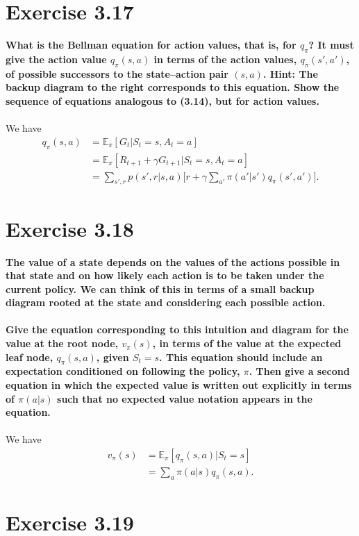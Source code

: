 \documentclass[a4paper,11pt]{article}
\numberwithin{equation}{section}
\theoremstyle{remark}
\newcommand{\E}{\mathbb E}
\begin{document}
\section{Exercise 3.17}

\textbf{What is the Bellman equation for action values, that is, for $q_\pi$? It must give the action value $q_\pi(s, a)$ in terms of the action values, $q_\pi(s', a')$, of possible successors to the state–action pair $(s, a)$. Hint: The backup diagram to the right corresponds to this equation. Show the sequence of equations analogous to (3.14), but for action values.}
\\ \\
We have
\begin{align*}
	q_\pi(s, a) & = \E_\pi[G_t | S_t=s, A_t=a] \\
				& = \E_\pi[R_{t+1} + \gamma G_{t+1} | S_t=s, A_t=a] \\
				& = \sum_{s', r} p(s', r | s, a) \Big[r + \gamma \sum_{a'} \pi(a' | s') q_\pi(s', a') \Big].
\end{align*}

\section{Exercise 3.18}

\textbf{The value of a state depends on the values of the actions possible in that state and on how likely each action is to be taken under the current policy. We can think of this in terms of a small backup diagram rooted at the state and considering each possible action.
\\ \\
Give the equation corresponding to this intuition and diagram for the value at the root node, $v_\pi(s)$, in terms of the value at the expected leaf node, $q_\pi(s, a)$, given $S_t = s$. This equation should include an expectation conditioned on following the policy, $\pi$. Then give a second equation in which the expected value is written out explicitly in terms of $\pi(a|s)$ such that no expected value notation appears in the equation.}
\\ \\
We have
\begin{align*}
	v_\pi(s) & = \E_\pi[q_\pi(s, a) | S_t = s] \\
			 & = \sum_{a} \pi(a | s) q_\pi(s, a).
\end{align*}

\section{Exercise 3.19}
\end{document}
